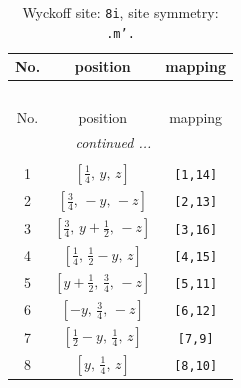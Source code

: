 \documentclass[fleqn,8pt]{jsarticle}
\begin{document}
\begin{longtable}{ccc}
\caption{Wyckoff site: {\tt 8i}, site symmetry: {\tt .m'.}}
 \\
 \hline \hline
No. & position & mapping \\ \hline \endfirsthead

\multicolumn{2}{l}{\tablename\ \thetable{}} \\
 \hline \hline
No. & position & mapping \\ \hline \endhead

 \hline \hline
\multicolumn{2}{r}{\footnotesize\it continued ...} \\ \endfoot

 \hline \hline
\multicolumn{2}{r}{} \\ \endlastfoot

1 & $\left[ \frac{1}{4},\, y,\, z \right]$ & {\tt [1,14]} \\ \hline
2 & $\left[ \frac{3}{4},\, - y,\, - z \right]$ & {\tt [2,13]} \\ \hline
3 & $\left[ \frac{3}{4},\, y + \frac{1}{2},\, - z \right]$ & {\tt [3,16]} \\ \hline
4 & $\left[ \frac{1}{4},\, \frac{1}{2} - y,\, z \right]$ & {\tt [4,15]} \\ \hline
5 & $\left[ y + \frac{1}{2},\, \frac{3}{4},\, - z \right]$ & {\tt [5,11]} \\ \hline
6 & $\left[ - y,\, \frac{3}{4},\, - z \right]$ & {\tt [6,12]} \\ \hline
7 & $\left[ \frac{1}{2} - y,\, \frac{1}{4},\, z \right]$ & {\tt [7,9]} \\ \hline
8 & $\left[ y,\, \frac{1}{4},\, z \right]$ & {\tt [8,10]} \\
\end{longtable}
\renewcommand{\arraystretch}{1.2}
\end{document}
